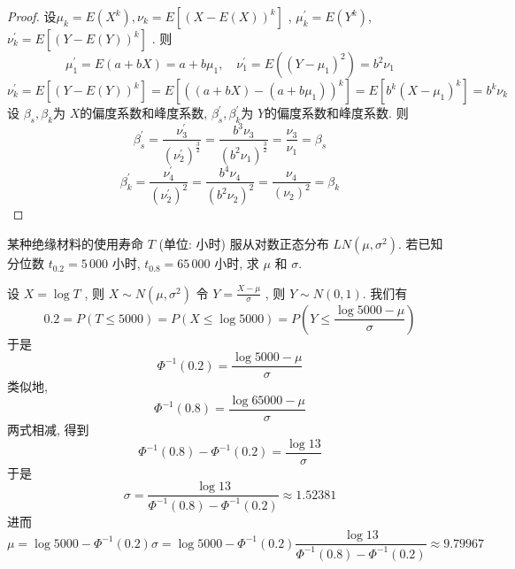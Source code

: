 \documentclass[../main.tex]{subfiles}
\begin{document}
\begin{proof}
 设\(  \mu _{k}= E\left( X^{k} \right), \nu _{k}= E\left[ \left( X-E\left( X \right)  \right)^{k}  \right]    \)  , \(  \mu ^{\prime} _{k}= E\left( Y^{k} \right)   \), \(  \nu ^{\prime} _{k}= E\left[ \left( Y-E\left( Y \right)  \right)  ^{k}\right]   \)  .  则 \[
 \mu _1 ^{\prime} = E\left( a+ bX \right) = a+ b\mu _1  ,\quad \nu _1 ^{\prime} = E\left( \left( Y-\mu _1  \right)^{2}  \right)= b^{2}\nu _1  
 \] \[
 \nu _k ^{\prime} = E\left[ \left( Y-E\left( Y \right)  \right)^{k}  \right]= E\left[ \left( \left( a+ bX \right)-\left( a+ b\mu _1  \right)   \right)^{k}  \right]   = E\left[ b^{k} \left( X-\mu _1  \right)^{k}  \right]= b^{k}\nu _{k}
 \] 设 \(  \beta _{s}, \beta _{k}  \)为 \(  X  \)的偏度系数和峰度系数,  \(  \beta _{s}^{\prime} , \beta _{k}^{\prime}   \)为 \(  Y  \)的偏度系数和峰度系数.  则 \[
 \beta _{s}^{\prime} = \frac{\nu _{3}^{\prime}  }{\left( \nu _2 ^{\prime}  \right)^{\frac{3 }{2 } }  }= \frac{b^{3}\nu _3 }{ \left( b^{2}\nu _1  \right)^{\frac{3 }{2 } } }= \frac{\nu _3  }{\nu _1  }= \beta _{s}   
 \]     \[
 \beta _{k}^{\prime} =  \frac{\nu _4 ^{\prime}  }{\left( \nu _2 ^{\prime}  \right)^{2}  }= \frac{b^{4}\nu _4  }{\left( b^{2}\nu _2  \right)^{2}  }= \frac{\nu _4  }{\left( \nu _2  \right)^{2}  }= \beta _{k}   
 \]
\end{proof}
\begin{exercise}{}{}
某种绝缘材料的使用寿命 $T$ (单位: 小时) 服从对数正态分布 $LN(\mu, \sigma^2)$. 若已知分位数 $t_{0.2} = 5\,000$ 小时, $t_{0.8} = 65\,000$ 小时, 求 $\mu$ 和 $\sigma$.
\end{exercise}
\begin{solution}
    设 \(  X=\log T \) , 则 \(  X\sim N\left( \mu , \sigma ^{2} \right)   \)  令 \(  Y= \frac{X-\mu  }{ \sigma  }   \) , 则 \(  Y\sim N\left( 0,1 \right)   \).  我们有 \[
    0.2= P\left( T\le 5000 \right)= P\left( X\le \log 5000 \right) = P\left( Y\le \frac{\log 5000 - \mu  }{ \sigma  }  \right)  
    \]于是 \[
    \Phi ^{-1} \left( 0.2 \right)= \frac{\log 5000 - \mu  }{ \sigma  }  
    \]类似地,  \[
    \Phi ^{-1} \left( 0.8 \right)=  \frac{\log 65000 -\mu  }{ \sigma  }  
    \]两式相减, 得到 \[
    \Phi ^{-1} \left( 0.8 \right)-\Phi ^{-1} \left( 0.2 \right)= \frac{\log 13 }{ \sigma  }   
    \]于是 \[
     \sigma = \frac{\log 13 }{\Phi ^{-1} \left( 0.8 \right)- \Phi ^{-1} \left( 0.2 \right)   } \approx 1.52381
    \]进而 \[
    \mu = \log 5000 - \Phi ^{-1} \left( 0.2 \right) \sigma = \log 5000 - \Phi ^{-1} \left( 0.2 \right)\frac{\log 13 }{\Phi ^{-1} \left( 0.8 \right)- \Phi ^{-1} \left( 0.2 \right)   }   \approx 9.79967
    \]
\end{solution}
\end{document}
